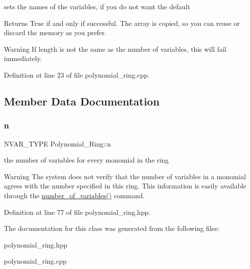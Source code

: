sets the names of the variables, if you do not want the default 

Returns {\ttfamily True} if and only if successful. The array is copied, so you can reuse or discard the memory as you prefer. \begin{DoxyWarning}{Warning}
If {\ttfamily length} is not the same as the number of variables, this will fail immediately. 
\end{DoxyWarning}


Definition at line 23 of file polynomial\+\_\+ring.\+cpp.



\subsection{Member Data Documentation}
\mbox{\label{class_polynomial___ring_abf753b41b3e84bd8e32de314f15f7826}} 
\subsubsection{\texorpdfstring{n}{n}}
{\footnotesize\ttfamily N\+V\+A\+R\+\_\+\+T\+Y\+PE Polynomial\+\_\+\+Ring\+::n\hspace{0.3cm}{\ttfamily [protected]}}



the number of variables for every monomial in the ring 

\begin{DoxyWarning}{Warning}
The system does not verify that the number of variables in a monomial agrees with the number specified in this ring. This information is easily available through the \hyperlink{class_polynomial___ring_a79e7dd821659e9d4b6862487963f7352}{number\+\_\+of\+\_\+variables()} command. 
\end{DoxyWarning}


Definition at line 77 of file polynomial\+\_\+ring.\+hpp.



The documentation for this class was generated from the following files\+:\begin{DoxyCompactItemize}
\item 
polynomial\+\_\+ring.\+hpp\item 
polynomial\+\_\+ring.\+cpp\end{DoxyCompactItemize}
